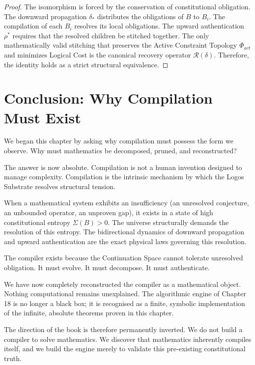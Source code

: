 \documentclass[12pt,openany]{extbook}
\theoremstyle{plain}
\theoremstyle{definition}
\begin{document}
\begin{proof}
The isomorphism is forced by the conservation of constitutional obligation. The downward propagation $\delta_*$ distributes the obligations of $B$ to $B_i$. The compilation of each $B_i$ resolves its local obligations. The upward authentication $\rho^*$ requires that the resolved children be stitched together. The only mathematically valid stitching that preserves the Active Constraint Topology $\Phi_{act}$ and minimizes Logical Cost is the canonical recovery operator $\mathcal{R}(\delta)$. Therefore, the identity holds as a strict structural equivalence.
\end{proof}

\section{Conclusion: Why Compilation Must Exist}

We began this chapter by asking why compilation must possess the form we observe. Why must mathematics be decomposed, pruned, and reconstructed?

The answer is now absolute. Compilation is not a human invention designed to manage complexity. Compilation is the intrinsic mechanism by which the Logos Substrate resolves structural tension. 

When a mathematical system exhibits an insufficiency (an unresolved conjecture, an unbounded operator, an unproven gap), it exists in a state of high constitutional entropy $\Sigma(B) > 0$. The universe structurally demands the resolution of this entropy. The bidirectional dynamics of downward propagation and upward authentication are the exact physical laws governing this resolution. 

The compiler exists because the Continuation Space cannot tolerate unresolved obligation. It must evolve. It must decompose. It must authenticate. 

We have now completely reconstructed the compiler as a mathematical object. Nothing computational remains unexplained. The algorithmic engine of Chapter 18 is no longer a black box; it is recognised as a finite, symbolic implementation of the infinite, absolute theorems proven in this chapter.

The direction of the book is therefore permanently inverted. We do not build a compiler to solve mathematics. We discover that mathematics inherently compiles itself, and we build the engine merely to validate this pre-existing constitutional truth.
\end{document}
